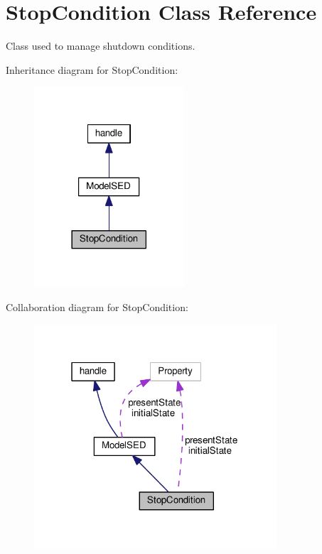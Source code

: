 \hypertarget{class_stop_condition}{}\section{Stop\+Condition Class Reference}
\label{class_stop_condition}


Class used to manage shutdown conditions.  




Inheritance diagram for Stop\+Condition\+:
\nopagebreak
\begin{figure}[H]
\begin{center}
\leavevmode
\includegraphics[width=158pt]{class_stop_condition__inherit__graph}
\end{center}
\end{figure}


Collaboration diagram for Stop\+Condition\+:
\nopagebreak
\begin{figure}[H]
\begin{center}
\leavevmode
\includegraphics[width=256pt]{class_stop_condition__coll__graph}
\end{center}
\end{figure}
